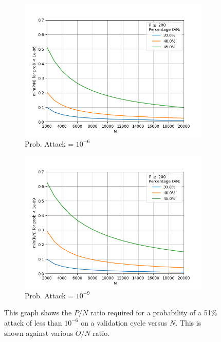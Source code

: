 \begin{figure}[H]
	\centering
	\begin{subfigure}[b]{0.45\textwidth}
		\includegraphics[width=\textwidth]{Figures/PoN_vs_N_Thre_Prob51_10em6_O30_to_45}
		
		\renewcommand{\thesubfigure}{a}
		\caption{Prob. Attack = $10^{-6}$}
		\label{fig:N20-50}
	\end{subfigure}
	\begin{subfigure}[b]{0.45\textwidth}
		\includegraphics[width=\textwidth]{Figures/PoN_vs_N_Thre_Prob51_10em9_O30_to_45}
		
		\renewcommand{\thesubfigure}{b}
		\caption{Prob. Attack = $10^{-9}$}
		\label{fig:N50-100}
	\end{subfigure}
\caption{\label{fig:threshV} This graph shows the $P/N$ ratio required for a probability of a 51\% attack of less than $10^{-6}$ on a validation cycle versus $N$. This is shown against various $O/N$ ratio. }
\end{figure}

